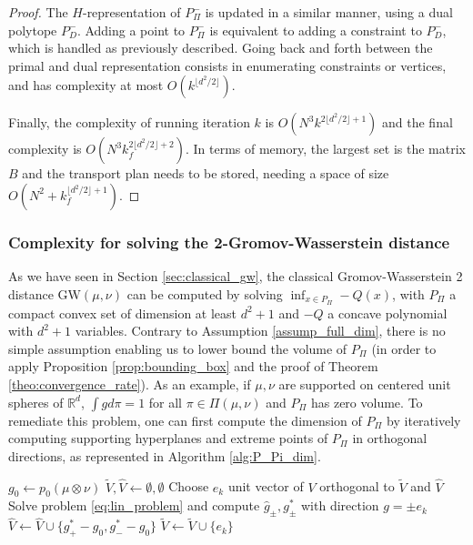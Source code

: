 \documentclass{article}
\newcommand{\R}{\mathbb{R}}
\newcommand{\1}{\mathbf{1}}
\newcommand{\GW}{\mathrm{GW}}
\theoremstyle{definition}
\theoremstyle{remark}
\begin{document}
\begin{appendices}
\begin{proof}
     The $H$-representation of $P_\Pi^-$ is updated in a similar manner, using a dual polytope $P_D^-$. Adding a point to $P_\Pi^-$ is equivalent to adding a constraint to $P_D^-$, which is handled as previously described. Going back and forth between the primal and dual representation consists in enumerating constraints or vertices, and has complexity at most $O(k^{\lfloor d^2/2\rfloor})$.

     Finally, the complexity of running iteration $k$ is $O(N^3k^{2 \lfloor d^2/2\rfloor+1})$ and the final complexity is $O(N^3k_f^{2 \lfloor d^2/2\rfloor+2})$. In terms of memory, the largest set is the matrix $B$ and the transport plan needs to be stored, needing a space of size $O(N^2+k_f^{\lfloor d^2/2\rfloor+1})$.
\end{proof}

\newpage
\subsubsection*{Complexity for solving the 2-Gromov-Wasserstein distance}

As we have seen in Section \ref{sec:classical_gw}, the classical Gromov-Wasserstein 2 distance $\GW(\mu,\nu)$ can be computed by solving $\inf_{x\in P_\Pi} -Q(x)$, with $P_\Pi$ a compact convex set of dimension at least $d^2+1$ and $-Q$ a concave polynomial with $d^2+1$ variables. Contrary to Assumption \ref{assump_full_dim}, there is no simple assumption enabling us to lower bound the volume of $P_\Pi$ (in order to apply Proposition \ref{prop:bounding_box} and the proof of Theorem \ref{theo:convergence_rate}). As an example, if $\mu,\nu$ are supported on centered unit spheres of $\R^d$, $\int gd\pi=1$ for all $\pi\in\Pi(\mu,\nu)$ and $P_\Pi$ has zero volume. To remediate this problem, one can first compute the dimension of $P_\Pi$ by iteratively computing supporting hyperplanes and extreme points of $P_\Pi$ in orthogonal directions, as represented in Algorithm \ref{alg:P_Pi_dim}.



\begin{algorithm}
\caption{Computing dimension of $P_\Pi$ }\label{alg:P_Pi_dim}
\begin{algorithmic}[1]
\State $g_0\gets p_0(\mu\otimes\nu)$
\State $\tilde{V},\hat{V}\gets \emptyset,\emptyset$
\State Choose $e_k$ unit vector of $V$ orthogonal to $\tilde{V}$ and $\hat{V}$
\State Solve problem \eqref{eq:lin_problem} and compute $\hat{g}_{\pm }, g^*_{\pm }$ with direction $g=\pm e_k$
\State $\hat{V}\gets\hat{V}\cup \{g^*_{+ }-g_0,g^*_{- }-g_0\}$
\State $\tilde{V}\gets\tilde{V} \cup \{e_k\}$
\EndIf
\EndFor


\end{algorithmic}
\end{algorithm}
\end{appendices}
\end{document}
